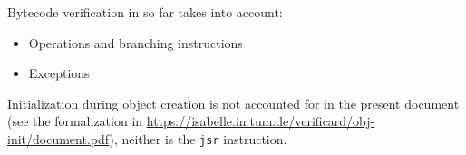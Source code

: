 Bytecode verification in \mJava{} so far takes into account:
\begin{itemize}
\item Operations and branching instructions
\item Exceptions
\end{itemize}
Initialization during object creation is not accounted for in the
present document 
(see the formalization in
\url{https://isabelle.in.tum.de/verificard/obj-init/document.pdf}),
neither is the \texttt{jsr} instruction.



